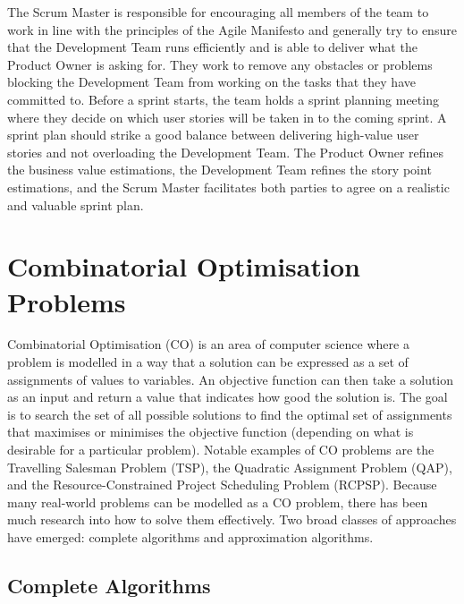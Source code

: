 The Scrum Master is responsible for encouraging all members of the team to work in line with the principles of the Agile Manifesto and generally try to ensure that the Development Team runs efficiently and is able to deliver what the Product Owner is asking for. They work to remove any obstacles or problems blocking the Development Team from working on the tasks that they have committed to. Before a sprint starts, the team holds a sprint planning meeting where they decide on which user stories will be taken in to the coming sprint. A sprint plan should strike a good balance between delivering high-value user stories and not overloading the Development Team. The Product Owner refines the business value estimations, the Development Team refines the story point estimations, and the Scrum Master facilitates both parties to agree on a realistic and valuable sprint plan.

\section{Combinatorial Optimisation Problems}

Combinatorial Optimisation (CO) is an area of computer science where a problem is modelled in a way that a solution can be expressed as a set of assignments of values to variables. An objective function can then take a solution as an input and return a value that indicates how good the solution is. The goal is to search the set of all possible solutions to find the optimal set of assignments that maximises or minimises the objective function (depending on what is desirable for a particular problem). Notable examples of CO problems are the Travelling Salesman Problem (TSP), the Quadratic Assignment Problem (QAP), and the Resource-Constrained Project Scheduling Problem (RCPSP). Because many real-world problems can be modelled as a CO problem, there has been much research into how to solve them effectively. Two broad classes of approaches have emerged: complete algorithms and approximation algorithms.

\subsection{Complete Algorithms}
\label{subsec:complete_algorithms}

